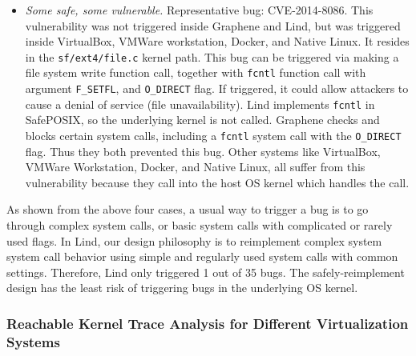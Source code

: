 \begin{itemize}
\item \emph{Some safe, some vulnerable.}  Representative bug: CVE-2014-8086. 
This vulnerability was not triggered inside Graphene and Lind, but was triggered inside 
VirtualBox, VMWare workstation, Docker, and Native Linux. It resides in the \texttt{sf/ext4/file.c} kernel path. 
This bug can be triggered via making a file system write function call, together with \texttt{fcntl} function call 
with argument \texttt{F\_SETFL}, and \texttt{O\_DIRECT} flag. If triggered, it could allow attackers to cause 
a denial of service (file unavailability). Lind implements \texttt{fcntl}
in SafePOSIX, so the underlying kernel is not called.
Graphene checks and blocks certain system calls, including
a \texttt{fcntl} system call with the \texttt{O\_DIRECT} flag. 
Thus they both prevented this bug. Other systems like VirtualBox, VMWare Workstation, Docker, and Native Linux, 
all suffer from this vulnerability because they call into the host OS
kernel which handles the call.

\end{itemize}

As shown from the above four cases, a usual way to trigger a bug is to go through complex system calls, 
or basic system calls with complicated or rarely used flags. In Lind, our 
design philosophy is to reimplement complex system system call behavior
using simple and regularly used system calls with common settings.
Therefore, Lind only triggered 
1 out of 35 bugs.  The safely-reimplement design
has the least risk of triggering bugs in the underlying OS kernel.

\subsubsection{Reachable Kernel Trace Analysis for Different Virtualization
Systems}
\label{Reachable-Kernel-Trace-Analysis-for-Different-Virtualization-Systems}

